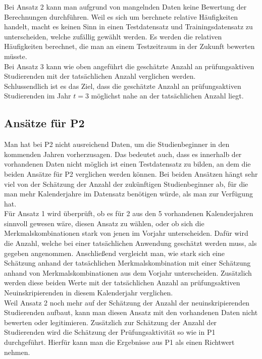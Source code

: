 Bei Ansatz 2 kann man aufgrund von mangelnden Daten keine Bewertung der Berechnungen durchf\"uhren. Weil es sich um berchnete relative H\"aufigkeiten
handelt, macht es keinen Sinn in einen Testdatensatz und Trainingsdatensatz zu unterscheiden, welche zuf\"allig gew\"ahlt werden. Es werden die relativen
H\"aufigkeiten berechnet, die man an einem Testzeitraum in der Zukunft bewerten m\"usste. \\

Bei Ansatz 3 kann wie oben angef\"uhrt die gesch\"atzte Anzahl an pr\"ufungsaktiven Studierenden mit der tats\"achlichen Anzahl verglichen werden. \\

Schlussendlich ist es das Ziel, dass die gesch\"atzte Anzahl an pr\"ufungsaktiven Studierenden im Jahr $t = 3$ m\"oglichst nahe an der tats\"achlichen Anzahl
liegt.



\subsection{Ans\"atze f\"ur P2}

Man hat bei P2 nicht ausreichend Daten, um die Studienbeginner in den kommenden Jahren  vorherzusagen. Das bedeutet auch, dass es innerhalb der vorhandenen
Daten nicht m\"oglich ist einen Testdatensatz zu bilden, an dem die beiden Ans\"atze f\"ur P2 verglichen werden k\"onnen. Bei beiden Ans\"atzen h\"angt
sehr viel von der Sch\"atzung der Anzahl der zuk\"unftigen Studienbeginner ab, f\"ur die man mehr Kalenderjahre im Datensatz ben\"otigen w\"urde, als
man zur Verf\"ugung hat. \\

F\"ur Ansatz 1 wird \"uberpr\"uft, ob es f\"ur 2 aus den 5 vorhandenen Kalenderjahren sinnvoll gewesen w\"are, diesen Ansatz zu w\"ahlen, oder ob sich die
Merkmalskombinationen stark von jenen im Vorjahr unterscheiden. Daf\"ur wird die Anzahl, welche bei einer tats\"achlichen Anwendung gesch\"atzt werden muss,
als gegeben angenommen. Anschlie{\ss}end vergleicht man, wie stark sich eine Sch\"atzung anhand der tats\"achlichen Merkmalskombination mit einer Sch\"atzung anhand von
Merkmalskombinationen aus dem Vorjahr unterscheiden. Zus\"atzlich werden diese beiden Werte mit der tats\"achlichen Anzahl an pr\"ufungsaktiven Neuinskripierenden
in diesem Kalenderjahr verglichen.\\

Weil Ansatz 2 noch mehr auf der Sch\"atzung der Anzahl der neuinskripierenden Studierenden aufbaut, kann man diesen Ansatz mit den vorhandenen Daten nicht bewerten oder legitimieren.
Zus\"atzlich zur Sch\"atzung der Anzahl der Studierenden wird die Sch\"atzung der Pr\"ufungsaktivit\"at so wie in P1 durchgef\"uhrt. Hierf\"ur kann man die
Ergebnisse aus P1 als einen Richtwert nehmen.